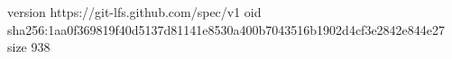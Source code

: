 version https://git-lfs.github.com/spec/v1
oid sha256:1aa0f369819f40d5137d81141e8530a400b7043516b1902d4cf3e2842e844e27
size 938
